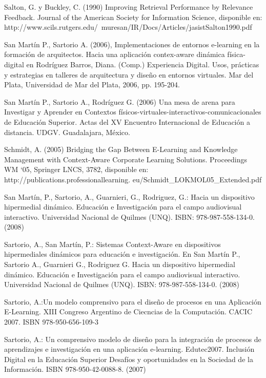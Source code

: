 \begin{thebibliography}{1}
\bibitem{} 
Salton, G. y Buckley, C. (1990) Improving Retrieval Performance by Relevance
Feedback. Journal of the American Society for Information Science, disponible
en: http://www.scils.rutgers.edu/~muresan/IR/Docs/Articles/jasistSalton1990.pdf

\bibitem{} 
San Martín P., Sartorio A. (2006), Implementaciones de entornos e-learning en la
formación de arquitectos. Hacia una aplicación contex-aware dinámica
física-digital en Rodríguez Barros, Diana. (Comp.) Experiencia Digital. Usos,
prácticas y estrategias en talleres de arquitectura y diseño en entornos
virtuales. Mar del Plata, Universidad de Mar del Plata, 2006, pp. 195-204.

\bibitem{} 
San Martín P., Sartorio A., Rodríguez G. (2006) Una mesa de arena para
Investigar y Aprender en
Contextos físicos-virtuales-interactivos-comunicacionales de Educación Superior.
Actas del XV Encuentro Internacional de Educación a distancia. UDGV.
Guadalajara, México.

\bibitem{} 
Schmidt, A. (2005) Bridging the Gap Between E-Learning and Knowledge Management
with Context-Aware Corporate Learning Solutions. Proceedings WM ‘05, Springer
LNCS, 3782, disponible en: http://publications.professionallearning.
eu/Schmidt_LOKMOL05_Extended.pdf


San Martín, P., Sartorio, A., Guarnieri, G., Rodriguez, G.: {Hacia un
dispositivo hipermedial dinámico. Educación e Investigación para el campo
audiovisual interactivo. Universidad Nacional de Quilmes (UNQ). ISBN:
978-987-558-134-0. (2008)}

Sartorio, A., San Martín, P.: {Sistemas Context-Aware en dispositivos
hipermediales dinámicos para educación e investigación. En San Martín P.,
Sartorio A., Guarnieri G., Rodriguez G. Hacia un dispositivo hipermedial
dinámico. Educación e Investigación para el campo audiovisual interactivo.
Universidad Nacional de Quilmes (UNQ). ISBN: 978-987-558-134-0. (2008)}

Sartorio, A.:{Un modelo comprensivo para el diseño de procesos en una
Aplicación E-Learning. XIII Congreso Argentino de Ciecncias de la Computación.
CACIC 2007. ISBN 978-950-656-109-3}

Sartorio, A.: {Un comprensivo modelo de diseño para la integración de procesos
de aprendizajes e investigación en una aplicación e-learning. Edutec2007.
Inclusión Digital en la Educación Superior Desafíos y oportunidades en la
Sociedad de la Información. ISBN 978-950-42-0088-8. (2007)}



\end{thebibliography}
